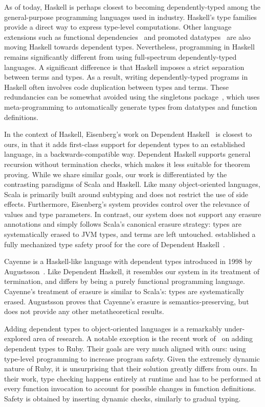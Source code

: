 As of today, Haskell is perhaps closest to becoming dependently-typed among the general-purpose programming languages used in industry.
Haskell's type families~\citep{kiselyov2010fun} provide a direct way to express type-level computations.
Other language extensions such as functional dependencies~\citep{jones2000type} and promoted datatypes~\citep{yorgey2012giving} are also moving Haskell towards dependent types.
Nevertheless, programming in Haskell remains significantly different from using full-spectrum dependently-typed languages.
A significant difference is that Haskell imposes a strict separation between terms and types.
As a result, writing dependently-typed programs in Haskell often involves code duplication between types and terms.
These redundancies can be somewhat avoided using the singletons package~\citep{eisenberg2012dependently}, which uses meta-programming to automatically generate types from datatypes and function definitions.

In the context of Haskell, Eisenberg's work on Dependent Haskell~\citep{eisenberg2016dependent} is closest to ours, in that it adds first-class support for dependent types to an established language, in a backwards-compatible way.
Dependent Haskell supports general recursion without termination checks, which makes it less suitable for theorem proving.
While we share similar goals, our work is differentiated by the contrasting paradigms of Scala and Haskell.
Like many object-oriented languages, Scala is primarily built around subtyping and does not restrict the use of side effects.
Furthermore, Eisenberg's system provides control over the relevance of values and type parameters.
In contrast, our system does not support any erasure annotations and simply follows Scala's canonical erasure strategy: types are systematically erased to JVM types, and terms are left untouched.
\citeauthor{weirich2017a} established a fully mechanized type safety proof for the core of Dependent Haskell~\citep{weirich2017a}.

Cayenne is a Haskell-like language with dependent types introduced in 1998 by Augustsson~\citep{augustsson1998cayenne}.
Like Dependent Haskell, it resembles our system in its treatment of termination, and differs by being a purely functional programming language.
Cayenne's treatment of erasure is similar to Scala's: types are systematically erased.
Augustsson proves that Cayenne's erasure is semantics-preserving, but does not provide any other metatheoretical results.

Adding dependent types to object-oriented languages is a remarkably under-explored area of research.
A notable exception is the recent work of~\cite{kazerounian2019type} on adding dependent types to Ruby.
Their goals are very much aligned with ours: using type-level programming to increase program safety.
Given the extremely dynamic nature of Ruby, it is unsurprising that their solution greatly differs from ours.
In their work, type checking happens entirely at runtime and has to be performed at every function invocation to account for possible changes in function definitions.
Safety is obtained by inserting dynamic checks, similarly to gradual typing.

